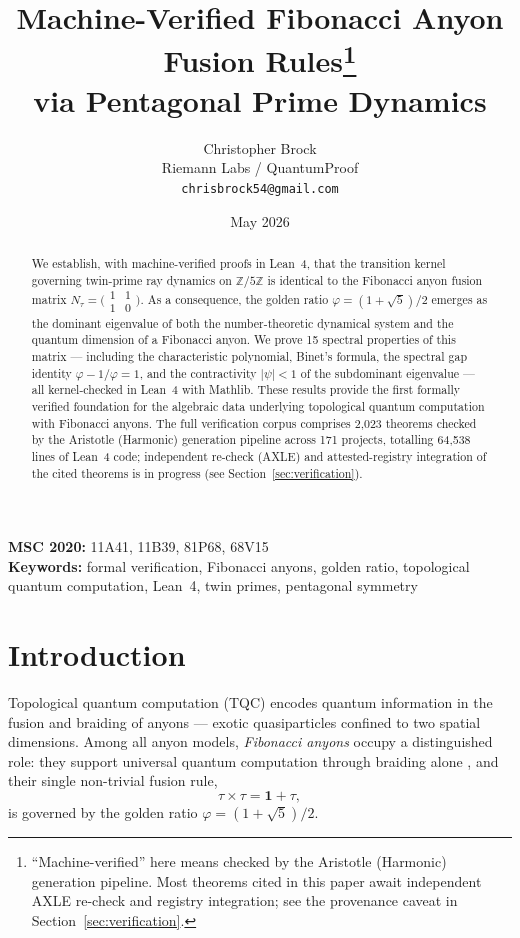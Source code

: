 \documentclass[11pt,a4paper]{article}
\title{Machine-Verified Fibonacci Anyon Fusion Rules\thanks{``Machine-verified'' here means checked by the Aristotle (Harmonic) generation pipeline. Most theorems cited in this paper await independent AXLE re-check and registry integration; see the provenance caveat in Section~\ref{sec:verification}.}\\via Pentagonal Prime Dynamics}
\author{Christopher Brock\\
  Riemann Labs / QuantumProof\\
  \texttt{chrisbrock54@gmail.com}}
\date{May 2026}
\newcommand{\Z}{\mathbb{Z}}
\begin{document}
\maketitle

\begin{abstract}
We establish, with machine-verified proofs in Lean~4, that the transition kernel
governing twin-prime ray dynamics on $\Z/5\Z$ is identical to the Fibonacci anyon
fusion matrix $N_\tau = \bigl(\begin{smallmatrix} 1 & 1 \\ 1 & 0 \end{smallmatrix}\bigr)$.
As a consequence, the golden ratio $\varphi = (1+\sqrt{5})/2$ emerges as the
dominant eigenvalue of both the number-theoretic dynamical system and the
quantum dimension of a Fibonacci anyon. We prove 15 spectral properties of this
matrix --- including the characteristic polynomial, Binet's formula, the spectral
gap identity $\varphi - 1/\varphi = 1$, and the contractivity $|\psi| < 1$ of the
subdominant eigenvalue --- all kernel-checked in Lean~4 with Mathlib.
These results provide the first formally verified foundation for the algebraic
data underlying topological quantum computation with Fibonacci anyons.
The full verification corpus comprises 2,023 theorems checked by the Aristotle
(Harmonic) generation pipeline across 171 projects, totalling 64,538 lines of
Lean~4 code; independent re-check (AXLE) and attested-registry integration of
the cited theorems is in progress (see Section~\ref{sec:verification}).
\end{abstract}

\noindent\textbf{MSC 2020:} 11A41, 11B39, 81P68, 68V15\\
\textbf{Keywords:} formal verification, Fibonacci anyons, golden ratio, topological quantum computation, Lean~4, twin primes, pentagonal symmetry

\section{Introduction}

Topological quantum computation (TQC) \cite{freedman2003,kitaev2003,nayak2008}
encodes quantum information in the fusion and braiding of anyons --- exotic
quasiparticles confined to two spatial dimensions. Among all anyon models,
\emph{Fibonacci anyons} occupy a distinguished role: they support universal
quantum computation through braiding alone \cite{bonesteel2005}, and their
single non-trivial fusion rule,
\begin{equation}\label{eq:fusion}
  \tau \times \tau = \mathbf{1} + \tau,
\end{equation}
is governed by the golden ratio $\varphi = (1+\sqrt{5})/2$.
\end{document}
